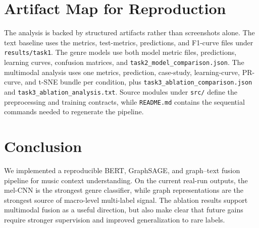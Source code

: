 \documentclass[conference]{IEEEtran}
\begin{document}
\section{Artifact Map for Reproduction}
The analysis is backed by structured artifacts rather than screenshots alone.
The text baseline uses the metrics, test-metrics, predictions, and F1-curve
files under \texttt{results/task1}. The genre models use both model metric
files, predictions, learning curves, confusion matrices, and
\texttt{task2\_model\_comparison.json}. The multimodal analysis uses one
metrics, prediction,
case-study, learning-curve, PR-curve, and t-SNE bundle per condition, plus
\texttt{task3\_ablation\_comparison.json} and
\texttt{task3\_ablation\_analysis.txt}. Source modules under \texttt{src/}
define the preprocessing and training contracts, while \texttt{README.md}
contains the sequential commands needed to regenerate the pipeline.

\section{Conclusion}
We implemented a reproducible BERT, GraphSAGE, and graph--text fusion
pipeline for music context understanding. On the current real-run outputs,
the mel-CNN is the strongest genre classifier, while graph representations
are the strongest source of macro-level multi-label signal. The
ablation results support multimodal fusion as a useful direction, but also
make clear that future gains require stronger supervision and improved
generalization to rare labels.



\end{document}
